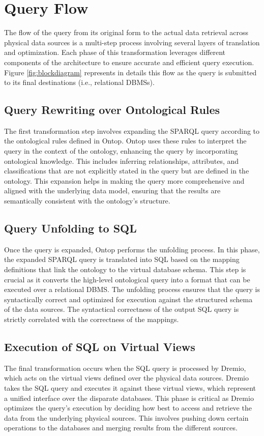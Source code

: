 \section{Query Flow}
The flow of the query from its original form to the actual data retrieval across physical data sources is a multi-step process involving several layers of translation and optimization. Each phase of this transformation leverages different components of the architecture to ensure accurate and efficient query execution. Figure \ref{fig:blockdiagram} represents in details this flow as the query is submitted to its final destinations (i.e., relational \ac{DBMS}s).
\subsection{Query Rewriting over Ontological Rules}
The first transformation step involves expanding the \ac{SPARQL} query according to the ontological rules defined in Ontop. Ontop uses these rules to interpret the query in the context of the ontology, enhancing the query by incorporating ontological knowledge. This includes inferring relationships, attributes, and classifications that are not explicitly stated in the query but are defined in the ontology. This expansion helps in making the query more comprehensive and aligned with the underlying data model, ensuring that the results are semantically consistent with the ontology's structure.
\subsection{Query Unfolding to SQL}
Once the query is expanded, Ontop performs the unfolding process. In this phase, the expanded \ac{SPARQL} query is translated into \ac{SQL} based on the mapping definitions that link the ontology to the virtual database schema. This step is crucial as it converts the high-level ontological query into a format that can be executed over a relational \ac{DBMS}. The unfolding process ensures that the query is syntactically correct and optimized for execution against the structured schema of the data sources. The syntactical correctness of the output \ac{SQL} query is strictly correlated with the correctness of the mappings.
\subsection{Execution of SQL on Virtual Views}
The final transformation occurs when the \ac{SQL} query is processed by Dremio, which acts on the virtual views defined over the physical data sources. Dremio takes the \ac{SQL} query and executes it against these virtual views, which represent a unified interface over the disparate databases. This phase is critical as Dremio optimizes the query's execution by deciding how best to access and retrieve the data from the underlying physical sources. This involves pushing down certain operations to the databases and merging results from the different sources.

